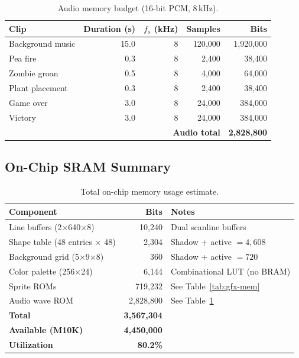 \documentclass[11pt,letterpaper]{article}
\begin{document}
\begin{table}[H]
\centering
\caption{Audio memory budget (16-bit PCM, 8\,kHz).}
\label{tab:audio-mem}
\begin{tabular}{l r r r r}
\toprule
\textbf{Clip} & \textbf{Duration (s)} & \textbf{$f_s$ (kHz)} & \textbf{Samples} & \textbf{Bits} \\
\midrule
Background music  & 15.0 & 8 & 120{,}000 & 1{,}920{,}000 \\
Pea fire          &  0.3 & 8 &   2{,}400 &    38{,}400 \\
Zombie groan      &  0.5 & 8 &   4{,}000 &    64{,}000 \\
Plant placement   &  0.3 & 8 &   2{,}400 &    38{,}400 \\
Game over         &  3.0 & 8 &  24{,}000 &   384{,}000 \\
Victory           &  3.0 & 8 &  24{,}000 &   384{,}000 \\
\midrule
\multicolumn{4}{r}{\textbf{Audio total}} & \textbf{2{,}828{,}800} \\
\bottomrule
\end{tabular}
\end{table}

\subsection{On-Chip SRAM Summary}

\begin{table}[H]
\centering
\caption{Total on-chip memory usage estimate.}
\label{tab:sram}
\begin{tabular}{l r l}
\toprule
\textbf{Component} & \textbf{Bits} & \textbf{Notes} \\
\midrule
Line buffers (2$\times$640$\times$8)   &    10{,}240 & Dual scanline buffers \\
Shape table (48 entries $\times$ 48)    &     2{,}304 & Shadow + active $= 4{,}608$ \\
Background grid (5$\times$9$\times$8)  &       360   & Shadow + active $= 720$ \\
Color palette (256$\times$24)           &     6{,}144 & Combinational LUT (no BRAM) \\
Sprite ROMs                             &   719{,}232 & See Table~\ref{tab:gfx-mem} \\
Audio wave ROM                          & 2{,}828{,}800 & See Table~\ref{tab:audio-mem} \\
\midrule
\textbf{Total}                          & \textbf{3{,}567{,}304} & \\
\textbf{Available (M10K)}              & \textbf{4{,}450{,}000} & \\
\textbf{Utilization}                    & \textbf{80.2\%} & \\
\bottomrule
\end{tabular}
\end{table}
\end{document}
